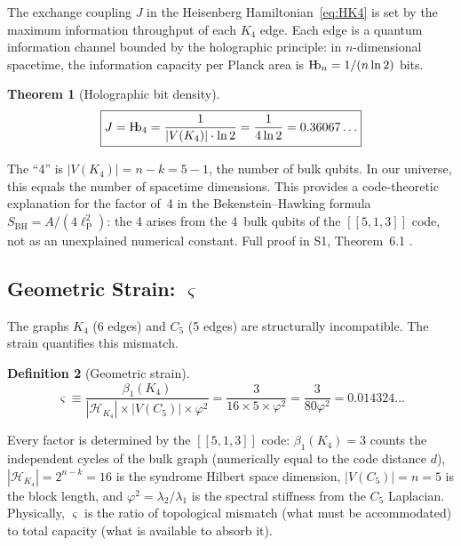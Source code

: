 \documentclass[11pt,a4paper]{article}
\newtheorem{theorem}{Theorem}[section]
\theoremstyle{definition}
\newtheorem{definition}[theorem]{Definition}
\newcommand{\Hb}{\textnormal{H\kern-0.3em b}}
\newcommand{\Hbn}{\Hb_n}
\newcommand{\Hbfour}{\Hb_4}
\newcommand{\strain}{\varsigma}
\newcommand{\lp}{\ell_{\mathrm{P}}}
\begin{document}
The exchange coupling $J$ in the Heisenberg Hamiltonian~\eqref{eq:HK4} is set by the maximum information throughput of each $K_4$ edge. Each edge is a quantum information channel bounded by the holographic principle: in $n$-dimensional spacetime, the information capacity per Planck area is $\Hbn = 1/(n \ln 2)$ bits.

\begin{theorem}[Holographic bit density]
\label{thm:hb4}
\begin{equation}
\boxed{J = \Hbfour = \frac{1}{|V(K_4)| \cdot \ln 2} = \frac{1}{4\ln 2} = 0.36067\ldots}
\label{eq:hb4}
\end{equation}
\end{theorem}

The ``4'' is $|V(K_4)| = n - k = 5 - 1$, the number of bulk qubits. In our universe, this equals the number of spacetime dimensions. This provides a code-theoretic explanation for the factor of~4 in the Bekenstein--Hawking formula $S_{\text{BH}} = A/(4\lp^2)$: the 4 arises from the 4~bulk qubits of the $[[5,1,3]]$ code, not as an unexplained numerical constant. Full proof in S1, Theorem~6.1 \cite{Hubka2026QSDsupp}.

\subsection{Geometric Strain: $\strain$}

The graphs $K_4$ (6 edges) and $C_5$ (5 edges) are structurally incompatible. The strain quantifies this mismatch.

\begin{definition}[Geometric strain]
\label{def:strain}
\begin{equation}
\boxed{\strain \equiv \frac{\beta_1(K_4)}{|\mathcal{H}_{K_4}| \times |V(C_5)| \times \varphi^2} = \frac{3}{16 \times 5 \times \varphi^2} = \frac{3}{80\varphi^2} = 0.014324\ldots}
\label{eq:strain}
\end{equation}
\end{definition}

Every factor is determined by the $[[5,1,3]]$ code: $\beta_1(K_4) = 3$ counts the independent cycles of the bulk graph (numerically equal to the code distance $d$), $|\mathcal{H}_{K_4}| = 2^{n-k} = 16$ is the syndrome Hilbert space dimension, $|V(C_5)| = n = 5$ is the block length, and $\varphi^2 = \lambda_2/\lambda_1$ is the spectral stiffness from the $C_5$ Laplacian. Physically, $\strain$ is the ratio of topological mismatch (what must be accommodated) to total capacity (what is available to absorb it).
\end{document}
